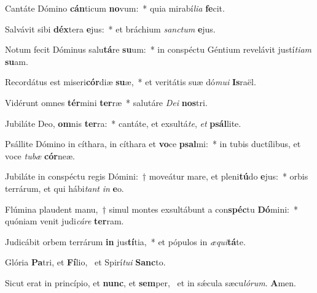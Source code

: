 \item Cantáte Dómino \textbf{cán}ticum \textbf{no}vum:~* quia mirabí\textit{li}\textit{a} \textbf{fe}cit.
\item Salvávit sibi \textbf{déx}tera \textbf{e}jus:~* et bráchium \textit{sanc}\textit{tum} \textbf{e}jus.
\item Notum fecit Dóminus salu\textbf{tá}re \textbf{su}um:~* in conspéctu Géntium revelávit justí\textit{ti}\textit{am} \textbf{su}am.
\item Recordátus est miseri\textbf{cór}diæ \textbf{su}æ,~* et veritátis suæ dó\textit{mu}\textit{i} \textbf{Is}raël.
\item Vidérunt omnes \textbf{tér}mini \textbf{ter}ræ~* salutáre \textit{De}\textit{i} \textbf{nos}tri.
\item Jubiláte Deo, \textbf{om}nis \textbf{ter}ra:~* cantáte, et exsultá\textit{te}, \textit{et} \textbf{psál}lite.
\item Psállite Dómino in cíthara, in cíthara et \textbf{vo}ce \textbf{psal}mi:~* in tubis ductílibus, et voce \textit{tu}\textit{bæ} \textbf{cór}neæ.
\item Jubiláte in conspéctu regis Dómini:~† moveátur mare, et pleni\textbf{tú}do \textbf{e}jus:~* orbis terrárum, et qui hábi\textit{tant} \textit{in} \textbf{e}o.
\item Flúmina plaudent manu,~† simul montes exsultábunt a con\textbf{spéc}tu \textbf{Dó}mini:~* quóniam venit judi\textit{cá}\textit{re} \textbf{ter}ram.
\item Judicábit orbem terrárum \textbf{in} jus\textbf{tí}tia,~* et pópulos in \textit{æ}\textit{qui}\textbf{tá}te.
\item Glória \textbf{Pa}tri, et \textbf{Fí}lio,~\psstar{} et Spirí\textit{tu}\textit{i} \textbf{Sanc}to.
\item Sicut erat in princípio, et \textbf{nunc}, et \textbf{sem}per,~\psstar{} et in sǽcula sæcu\textit{ló}\textit{rum}. \textbf{A}men.